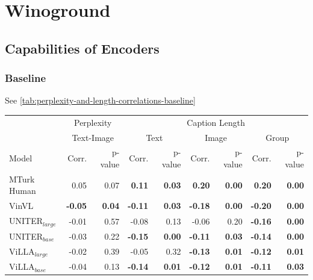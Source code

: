 \section{Winoground}

\subsection{Capabilities of Encoders}

\subsubsection{Baseline}

See \cref{tab:perplexity-and-length-correlations-baseline}

\begin{table}[ht]
\centering
\begin{adjustbox}{max width=\textwidth}
\begin{tabular}{l|rr|rrrrrr}
\toprule
 & \multicolumn{2}{c|}{Perplexity} &  \multicolumn{6}{c}{Caption Length}\\
 & \multicolumn{2}{c|}{Text-Image} &  \multicolumn{2}{c}{Text} &  \multicolumn{2}{c}{Image} &  \multicolumn{2}{c}{Group}\\
 Model      &   Corr. &   p-value & Corr. &   p-value & Corr. &   p-value & Corr. &   p-value\\\midrule 
  MTurk Human                  & 0.05           & 0.07          & \textbf{0.11}  & \textbf{0.03} & \textbf{0.20}  & \textbf{0.00} & \textbf{0.20}  & \textbf{0.00} \\
 VinVL                        & \textbf{-0.05} & \textbf{0.04} & \textbf{-0.11} & \textbf{0.03} & \textbf{-0.18} & \textbf{0.00} & \textbf{-0.20} & \textbf{0.00} \\
 UNITER$_{large}$             & -0.01          & 0.57          & -0.08          & 0.13          & -0.06          & 0.20          & \textbf{-0.16} & \textbf{0.00} \\
 UNITER$_{base}$              & -0.03          & 0.22          & \textbf{-0.15} & \textbf{0.00} & \textbf{-0.11} & \textbf{0.03} & \textbf{-0.14} & \textbf{0.00} \\
 ViLLA$_{large}$              & -0.02          & 0.39          & -0.05          & 0.32          & \textbf{-0.13} & \textbf{0.01} & \textbf{-0.12} & \textbf{0.01} \\
 ViLLA$_{base}$               & -0.04          & 0.13          & \textbf{-0.14} & \textbf{0.01} & \textbf{-0.12} & \textbf{0.01} & \textbf{-0.11} & \textbf{0.03} \\

\end{tabular}
\end{adjustbox}
\end{table}
